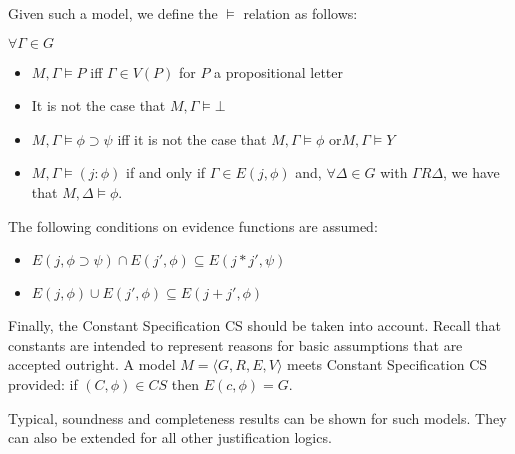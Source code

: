 Given such a model, we define the $\models$ relation as follows:
\begin{mdframed}
$\forall \Gamma\in G$
\begin{itemize}
    

    \item[] $M, \Gamma \models P$ iff $\Gamma \in V(P)$ for $P$ a propositional letter
    \item  It is not the case that $M, \Gamma \models \bot$
     \item   $M, \Gamma \models \phi \supset \psi$ iff it is not the case that $M, \Gamma \models \phi$ or$ M, \Gamma\models Y$
     \item  $M,\Gamma \models (j:\phi)$ if and only if $\Gamma \in E(j,\phi)$ and, $\forall \Delta\in G$ with $\Gamma R \Delta$, we have that $M,\Delta\models \phi$.
     
\end{itemize}
\end{mdframed}


 The following conditions on evidence functions are assumed:
\begin{itemize}
\item[] $E(j,\phi\supset\psi)\cap E(j',\phi) \subseteq E(j*j',\psi)$
\item[]  $E(j,\phi) \cup E(j',\phi)\subseteq E(j + j',\phi) $
\end{itemize}
   


Finally, the Constant Specification CS should be taken into account. Recall that constants are intended to represent reasons for basic assumptions that are accepted outright. A model $M = \langle G,R,E,V\rangle$ meets Constant Specification CS provided: if $(C,\phi) \in CS$ then $E(c,\phi) = G$.

Typical, soundness and completeness results can be shown for such models. They can also be extended for all other justification logics.